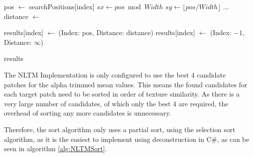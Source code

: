 \begin{algorithm}[ht!]
\caption{Nonlocal Texture Matching cached candidate patch search}
\label{alg:NltmCachedPositions}
\begin{algorithmic}[2]

    \State pos $\gets$ searchPositions[index]
    \State $sx \gets pos \bmod Width$
    \State $sy \gets \lfloor pos / Width \rfloor$
...
    \State distance $\gets$ 

        \State results[index] $\gets$ (Index: pos, Distance: distance)
    \Else
        \State results[index] $\gets$ (Index: $-1$, Distance: $\infty$)
    \EndIf

    \State \Return results
\EndFunction
\end{algorithmic}
\end{algorithm}

The NLTM Implementation is only configured to use the best 4 candidate patches for the alpha trimmed mean values.
This means the found candidates for each target patch need to be sorted in order of texture similarity. As there is a very large number of candidates, of which only the best 4 are required, the overhead of sorting any more candidates is unnecessary.

Therefore, the sort algorithm only uses a partial sort, using the selection sort algorithm, as it is the easiest to implement using deconstruction in C\string#, as can be seen in algorithm \ref{alg:NLTMSort}.

